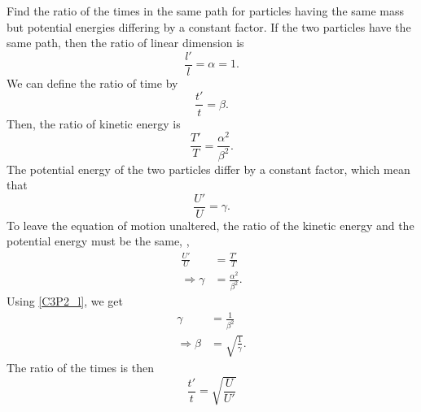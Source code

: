 
\begin{problem}
{
Find the ratio of the times in the same path for particles having the same mass but potential energies differing by a constant factor.
}
{
If the two particles have the same path, then the ratio of linear dimension is
\begin{equation} \label{C3P2_l}
    \frac{l'}{l} = \alpha = 1.
\end{equation}
We can define the ratio of time by
\begin{equation*}
    \frac{t'}{t} = \beta .
\end{equation*}
Then, the ratio of kinetic energy is 
\begin{equation*}
    \frac{T'}{T} = \frac{\alpha^2}{\beta^2}.
\end{equation*}
The potential energy of the two particles differ by a constant factor, which mean that
\begin{equation*}
    \frac{U'}{U} = \gamma .
\end{equation*}
To leave the equation of motion unaltered, the ratio of the kinetic energy and the potential energy must be the same, \ie,
\begin{align*}
    \frac{U'}{U} &= \frac{T'}{T} \\
    \Rightarrow \gamma &=  \frac{\alpha^2}{\beta^2}.
\end{align*}
Using \eqref{C3P2_l}, we get
\begin{align*}
    \gamma &= \frac{1}{\beta^2} \\
    \Rightarrow \beta &= \sqrt{\frac{1}{\gamma}}.
\end{align*}
The ratio of the times is then
}
{
\begin{equation*}
    \frac{t'}{t} = \sqrt{\frac{U}{U'}}
\end{equation*}
}
\end{problem}
